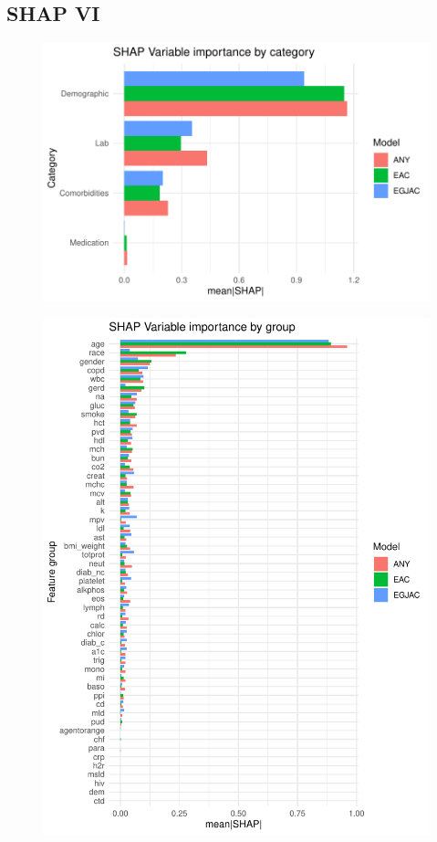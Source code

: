 \documentclass[english]{article}
\begin{document}
\newpage
\clearpage
\subsection{SHAP VI}


\begin{figure}[ht]
\includegraphics[width=0.8\linewidth]{variable_importance/shap_cat.pdf}
\end{figure}


\begin{figure}[ht]
\includegraphics[width=0.8\linewidth]{variable_importance/shap_group.pdf}
\end{figure}
\end{document}
